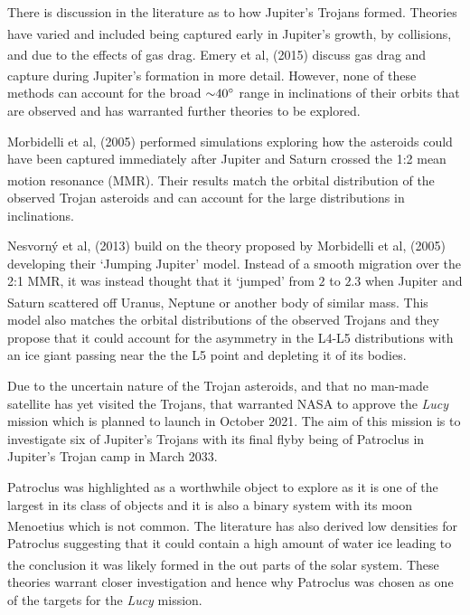 \documentclass[10pt, twocolumn]{revtex4}    %
\newcommand{\scite}[1]{\textsuperscript{\cite{#1}}}
\begin{document}
There is discussion in the literature as to how Jupiter's Trojans formed. Theories have varied and included being captured early in Jupiter's growth,\scite{FlemingoriginTrojanasteroids2000} by collisions,\scite{ShoemakerTrojanasteroidsPopulations1989} and due to the effects of gas drag.\scite{KortenkampCaptureTrojanAsteroids2001} Emery et al, (2015) discuss gas drag and capture during Jupiter's formation in more detail.\textsuperscript{\cite{EmeryComplexHistoryTrojan2015}} However, none  of these methods can account for the broad ${\sim}40\degree$ range in inclinations of their orbits that are observed and has warranted further theories to be explored.

Morbidelli et al, (2005) performed simulations exploring how the asteroids could have been captured immediately after Jupiter and Saturn crossed the 1:2 mean motion resonance (MMR).\textsuperscript{\cite{MorbidelliChaoticcaptureJupiter2005a}} Their results match the orbital distribution of the observed Trojan asteroids and can account for the large distributions in inclinations.
 
Nesvorn\'y et al, (2013) build on the theory proposed by Morbidelli et al, (2005) developing their `Jumping Jupiter' model. Instead of a smooth migration over the 2:1 MMR, it was instead thought that it `jumped' from $2$ to $2.3$ when Jupiter and Saturn scattered off Uranus, Neptune or another body of similar mass.\scite{NesvornyCaptureTrojansJumping2013} This model also matches the orbital distributions of the observed Trojans and they propose that it could account for the asymmetry in the L4-L5 distributions with an ice giant passing near the the L5 point and depleting it of its bodies.

Due to the uncertain nature of the Trojan asteroids, and that no man-made satellite has yet visited the Trojans, that warranted NASA to approve the \textit{Lucy} mission which is planned to launch in October 2021. The aim of this mission is to investigate six of Jupiter's Trojans with its final flyby being of Patroclus in Jupiter's Trojan camp in March 2033. 

Patroclus was highlighted as a worthwhile object to explore as it is one of the largest in its class of objects and it is also a binary system with its moon Menoetius which is not common.\scite{BuieSIZESHAPESTELLAR2015} The literature has also derived low densities for Patroclus suggesting that it could contain a high amount of water ice leading to the conclusion it was likely formed in the out parts of the solar system.\scite{Marchislowdensity8gcm32006}\scite{YangSpectroscopicSearchWater2006} These theories warrant closer investigation and hence why Patroclus was chosen as one of the targets for the \textit{Lucy} mission.
\end{document}
